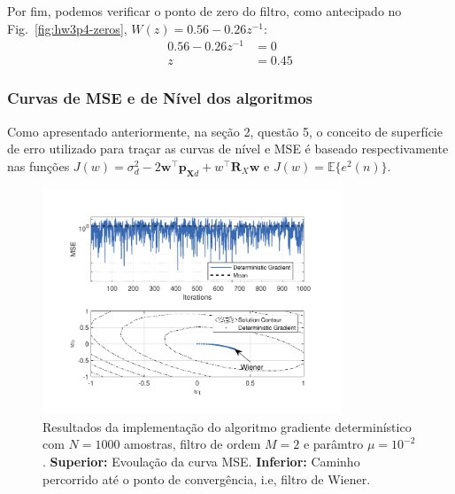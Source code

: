 Por fim, podemos verificar o ponto de zero do filtro, como antecipado no Fig.~\ref{fig:hw3p4-zeros}, $ W(z) = 0.56 - 0.26 z^{-1}$:
\begin{align*}
    0.56 - 0.26 z^{-1} &= 0 \\
    z &= 0.45
\end{align*}

\subsubsection*{Curvas de MSE e de Nível dos algoritmos}

Como apresentado anteriormente, na seção 2, questão 5, o conceito de superfície de erro utilizado para traçar as curvas de nível e MSE é baseado respectivamente nas funções $J(w) = \sigma^{2}_{d} - 2\mathbf{w}^{\top}\mathbf{p}_{\mathbf{X} d} + w^{\top}\mathbf{R}_{X}\mathbf{w} $ e $J(w) = \mathbb{E}\{e^{2}(n)\}$.

\begin{figure}[!htp]
    \centering
    \includegraphics[width=0.80\textwidth]{fig/hw3p4-dga.pdf}
    \caption{Resultados da implementação do algoritmo gradiente determinístico com $N = 1000$ amostras, filtro de ordem $M = 2$ e parâmtro $\mu = 10^{-2}$. \textbf{Superior:} Evoulação da curva MSE. \textbf{Inferior:} Caminho percorrido até o ponto de convergência, i.e, filtro de Wiener.}
    \label{fig:hw3p4-dga}
\end{figure}

